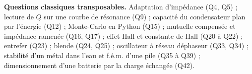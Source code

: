 \documentclass[11pt,a4paper]{article}
\begin{document}
\textbf{Questions classiques transposables.} Adaptation d'impédance (Q4, Q5) ; lecture de \(Q\) sur une courbe de résonance (Q9) ; capacité du condensateur plan par l'énergie (Q12) ; Monte-Carlo en Python (Q15) ; mutuelle compensée et impédance ramenée (Q16, Q17) ; effet Hall et constante de Hall (Q20 à Q22) ; entrefer (Q23) ; blende (Q24, Q25) ; oscillateur à réseau déphaseur (Q33, Q34) ; stabilité d'un métal dans l'eau et f.é.m. d'une pile (Q35 à Q39) ; dimensionnement d'une batterie par la charge échangée (Q42).
\end{document}
